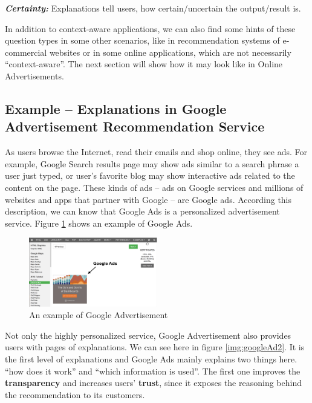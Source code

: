     \indent \textbf{\textit{Certainty:}} Explanations tell users, how certain/uncertain the output/result is.

    In addition to context-aware applications, we can also find some hints of these question types in some other scenarios, like in recommendation systems of e-commercial websites or 
    in some online applications, which are not necessarily ``context-aware''. The next section will show how it may look like in Online Advertisements.
    \subsection{Example -- Explanations in Google Advertisement Recommendation Service}
        As users browse the Internet, read their emails and shop online, they see ads. 
        For example, Google Search results page may show ads similar to a search phrase a user just typed, 
        or user's favorite blog may show interactive ads related to the content on the page.
        These kinds of ads – ads on Google services and millions of websites and apps that partner with Google – are Google ads\cite{googleAdSetting}.
        According this description, we can know that Google Ads is a personalized advertisement service.
        Figure \ref{img:googleAd1} shows an example of Google Ads.
        \begin{figure}[H]
            \centering
            \captionsetup{justification=centering}
            \includegraphics[width=0.5\textwidth]{img/googleAd1}
            \caption{An example of Google Advertisement\cite{googleAd1}}
            \label{img:googleAd1}
        \end{figure}
        \indent Not only the highly personalized service, 
        Google Advertisement also provides users with pages of explanations. 
        We can see here in figure \ref{img:googleAd2}.
        It is the first level of explanations and Google Ads mainly explains two things here.
        ``how does it work'' and ``which information is used''. The first one improves the \textbf{transparency} 
        and increases users' \textbf{trust}, since it exposes the reasoning behind the recommendation to its customers.
